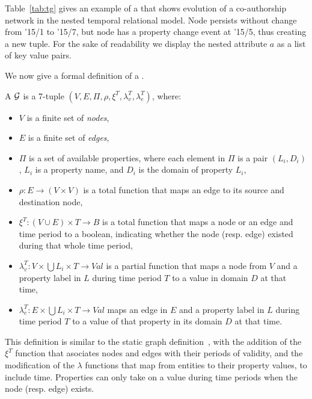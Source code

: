 Table~\ref{tab:tg} gives an example of a \tg that shows evolution of a
co-authorship network in the nested temporal relational model.  Node
 persists without change from '15/1 to '15/7, but node
 has a property change event at '15/5, thus creating a new
tuple.  For the sake of readability we display the nested attribute
$a$ as a list of key value pairs.

We now give a formal definition of a \tg.

\begin{definition}[TGraph]
\label{def:tg1}
A \tg $\mathcal{G}$ is a 7-tuple \break $(V,E,\Pi,\rho,\xi^T,\lambda^T_v,\lambda^T_e)$, where:

\begin{itemize}[noitemsep,itemindent=\dimexpr{}+\relax,leftmargin=7pt]
\item $V$ is a finite set of {\em nodes},
\item $E$ is a finite set of {\em edges},
\item $\Pi$ is a set of available properties, where each element in $\Pi$ is a pair $(L_i,D_i)$, $L_i$ is a property name, and $D_i$ is the domain of property $L_i$,
\item $\rho: E \to (V \times V)$ is a total function that maps an edge to its source and destination node,
\item $\xi^T: (V \cup E) \times T \to B$ is a total function that maps a node or an edge and time period to a boolean, indicating whether the node (resp. edge) existed during that whole time period,
\item $\lambda^T_v: V \times \bigcup L_i \times T \to Val$ is a partial function that maps a node from $V$ and a property label in $L$ during time period $T$ to a value in domain $D$ at that time,
\item $\lambda^T_e: E \times \bigcup L_i \times T \to Val$ maps an edge in $E$ and a property label in $L$ during time period $T$ to a value of that property in its domain $D$ at that time.
\end{itemize}
\end{definition}

This definition is similar to the static graph
definition~\cite{DBLP:journals/corr/AnglesABHRV16}, with the addition
of the $\xi^T$ function that asociates nodes and edges with their
periods of validity, and the modification of the $\lambda$ functions
that map from entities to their property values, to include time.
Properties can only take on a value during time periods when the node
(resp. edge) exists.

